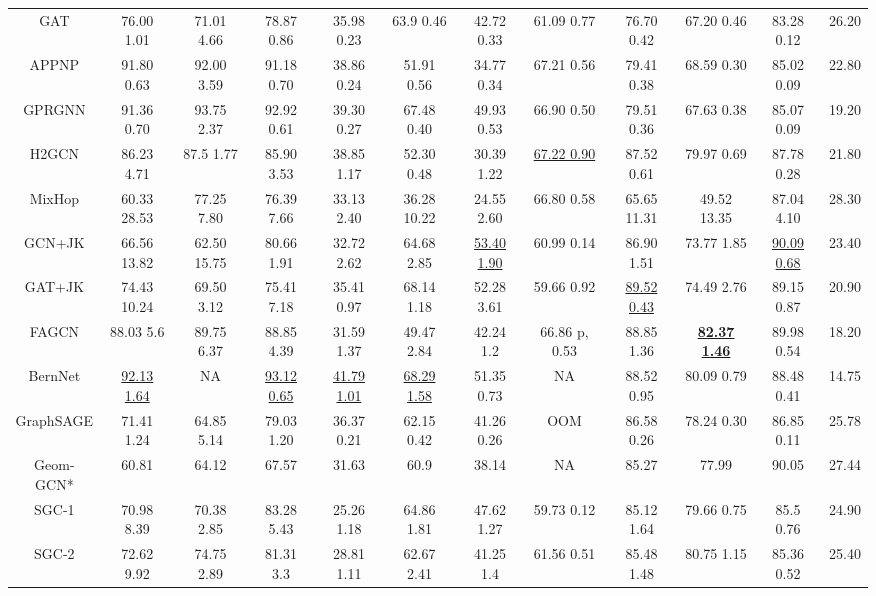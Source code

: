 \documentclass{article}
\newcommand{\0}{{\boldsymbol{0}}}
\newcommand{\6}{{\partial}}
\newcommand{\8}{{\infty}}
\newcommand{\4}{{\nabla}}
\begin{document}
\begin{table}[htbp]
\begin{tabular}{c|cccccccccc|c}
    \midrule
    GAT   & 76.00  1.01 & 71.01  4.66 & 78.87  0.86 & 35.98  0.23 & 63.9  0.46 & 42.72  0.33 & 61.09  0.77 & 76.70  0.42 & 67.20  0.46 & 83.28  0.12 & 26.20 \\
    APPNP & 91.80  0.63 & 92.00  3.59 & 91.18  0.70 & 38.86  0.24 & 51.91  0.56 & 34.77  0.34 & 67.21  0.56 & 79.41  0.38 & 68.59  0.30 & 85.02  0.09 & 22.80 \\
    GPRGNN & 91.36  0.70 & 93.75  2.37 & 92.92  0.61 & 39.30  0.27 & 67.48  0.40 & 49.93  0.53 & 66.90  0.50 & 79.51 0.36 & 67.63  0.38 & 85.07  0.09 & 19.20 \\
    H2GCN & 86.23  4.71 & 87.5  1.77 & 85.90  3.53 & 38.85  1.17 & 52.30  0.48 & 30.39  1.22 & \underline{67.22  0.90} & 87.52  0.61 & 79.97  0.69 & 87.78  0.28 & 21.80 \\
    MixHop & 60.33  28.53 & 77.25  7.80 & 76.39  7.66 & 33.13  2.40 & 36.28  10.22 & 24.55  2.60 & 66.80  0.58 & 65.65  11.31 & 49.52  13.35 & 87.04  4.10 & 28.30 \\
    GCN+JK & 66.56  13.82 & 62.50  15.75 & 80.66  1.91 & 32.72  2.62 & 64.68  2.85 & \underline{53.40  1.90} & 60.99  0.14 & 86.90  1.51 & 73.77  1.85 & \underline{90.09  0.68} & 23.40 \\
     GAT+JK & 74.43  10.24 & 69.50  3.12 & 75.41  7.18 & 35.41  0.97 & 68.14  1.18 & 52.28  3.61 & 59.66  0.92 & \underline{89.52  0.43} & 74.49  2.76 & 89.15  0.87 & 20.90 \\
    FAGCN & 88.03  5.6 & 89.75  6.37 & 88.85  4.39 & 31.59  1.37 & 49.47  2.84 & 42.24  1.2 & 66.86 p, 0.53 & 88.85  1.36 & \underline{\cellcolor[rgb]{ .816,  .808,  .808}\textbf{82.37  1.46}} & 89.98  0.54 & 18.20 \\
    BernNet & \underline{92.13  1.64} & NA    & \underline{93.12  0.65} & \underline{41.79  1.01} & \underline{68.29  1.58} & 51.35  0.73 & NA    & 88.52  0.95 & 80.09  0.79 & 88.48  0.41 & 14.75 \\
    GraphSAGE & 71.41  1.24 & 64.85  5.14 & 79.03  1.20 & 36.37  0.21 & 62.15  0.42 & 41.26  0.26 & OOM   & 86.58  0.26 & 78.24  0.30 & 86.85  0.11 & 25.78 \\
    Geom-GCN* & 60.81 & 64.12 & 67.57 & 31.63 & 60.9  & 38.14 & NA    & 85.27 & 77.99 & 90.05 & 27.44 \\
    \midrule
    SGC-1 & 70.98  8.39 & 70.38  2.85 & 83.28  5.43 & 25.26  1.18 & 64.86  1.81 & 47.62  1.27 & 59.73  0.12 & 85.12  1.64 & 79.66  0.75 & 85.5  0.76 & 24.90 \\
    SGC-2 & 72.62  9.92 & 74.75  2.89 & 81.31  3.3 & 28.81  1.11 & 62.67  2.41 & 41.25  1.4 & 61.56  0.51 & 85.48  1.48 & 80.75  1.15 & 85.36  0.52 & 25.40 \\

\end{tabular}
\end{table}
\end{document}
